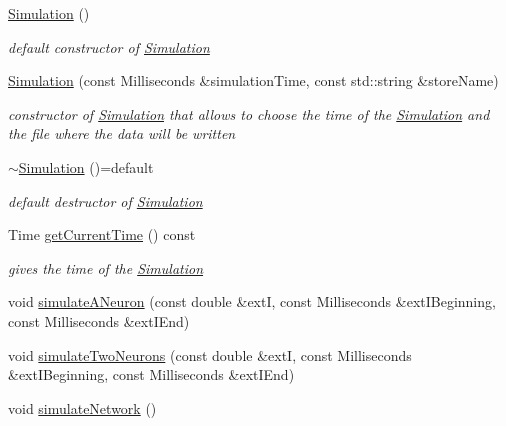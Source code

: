 \begin{DoxyCompactItemize}
\item 
\hyperlink{classSimulation_a5b224cc5b36bcc8eb29689aff223de41}{Simulation} ()
\begin{DoxyCompactList}\small\item\em default constructor of \hyperlink{classSimulation}{Simulation} \end{DoxyCompactList}\item 
\hyperlink{classSimulation_ae450f79abac7a43794aa946c2c708a79}{Simulation} (const Milliseconds \&simulation\+Time, const std\+::string \&store\+Name)
\begin{DoxyCompactList}\small\item\em constructor of \hyperlink{classSimulation}{Simulation} that allows to choose the time of the \hyperlink{classSimulation}{Simulation} and the file where the data will be written \end{DoxyCompactList}\item 
\hyperlink{classSimulation_aabcfa929f9e6622346ece569f0229a91}{$\sim$\+Simulation} ()=default\hypertarget{classSimulation_aabcfa929f9e6622346ece569f0229a91}{}\label{classSimulation_aabcfa929f9e6622346ece569f0229a91}

\begin{DoxyCompactList}\small\item\em default destructor of \hyperlink{classSimulation}{Simulation} \end{DoxyCompactList}\item 
Time \hyperlink{classSimulation_a95bb6273bcc774ad750242db5bc5a58b}{get\+Current\+Time} () const 
\begin{DoxyCompactList}\small\item\em gives the time of the \hyperlink{classSimulation}{Simulation} \end{DoxyCompactList}\item 
void \hyperlink{classSimulation_a87d231aa29cd6fa002db42255809eebc}{simulate\+A\+Neuron} (const double \&extI, const Milliseconds \&ext\+I\+Beginning, const Milliseconds \&ext\+I\+End)
\item 
void \hyperlink{classSimulation_a4f14cd93475b42b2c7820429c11310ec}{simulate\+Two\+Neurons} (const double \&extI, const Milliseconds \&ext\+I\+Beginning, const Milliseconds \&ext\+I\+End)
\item 
void \hyperlink{classSimulation_adac9da47097e52547c8fada8a1d9ba46}{simulate\+Network} ()
\end{DoxyCompactItemize}


